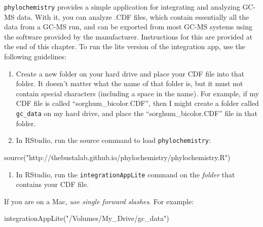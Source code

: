 \documentclass[
]{krantz}
\newenvironment{Shaded}{\begin{snugshade}}{\end{snugshade}}
\newcommand{\FunctionTok}[1]{\textcolor[rgb]{0.00,0.00,0.00}{#1}}
\newcommand{\NormalTok}[1]{#1}
\newcommand{\StringTok}[1]{\textcolor[rgb]{0.31,0.60,0.02}{#1}}
\providecommand{\tightlist}{%
  \setlength{\itemsep}{0pt}\setlength{\parskip}{0pt}}
\begin{document}
\texttt{phylochemistry} provides a simple application for integrating and analyzing GC-MS data. With it, you can analyze .CDF files, which contain essentially all the data from a GC-MS run, and can be exported from most GC-MS systems using the software provided by the manufacturer. Instructions for this are provided at the end of this chapter. To run the lite version of the integration app, use the following guidelines:

\begin{enumerate}
\def\labelenumi{\arabic{enumi}.}
\item
  Create a new folder on your hard drive and place your CDF file into that folder. It doesn't matter what the name of that folder is, but it must not contain special characters (including a space \texttt{} in the name). For example, if my CDF file is called ``sorghum\_bicolor.CDF'', then I might create a folder called \texttt{gc\_data} on my hard drive, and place the ``sorghum\_bicolor.CDF'' file in that folder.
\item
  In RStudio, run the source command to load \texttt{phylochemistry}:
\end{enumerate}

\begin{Shaded}
\begin{Highlighting}[]
\FunctionTok{source}\NormalTok{(}\StringTok{"http://thebustalab.github.io/phylochemistry/phylochemistry.R"}\NormalTok{)}
\end{Highlighting}
\end{Shaded}

\hfill\break

\begin{enumerate}
\def\labelenumi{\arabic{enumi}.}
\setcounter{enumi}{2}
\tightlist
\item
  In RStudio, run the \texttt{integrationAppLite} command on the \emph{folder} that contains your CDF file.\\
\end{enumerate}

If you are on a Mac, \emph{use single forward slashes}. For example:

\begin{Shaded}
\begin{Highlighting}[]
\FunctionTok{integrationAppLite}\NormalTok{(}\StringTok{"/Volumes/My\_Drive/gc\_data"}\NormalTok{)}
\end{Highlighting}
\end{Shaded}

\hfill\break
\end{document}
